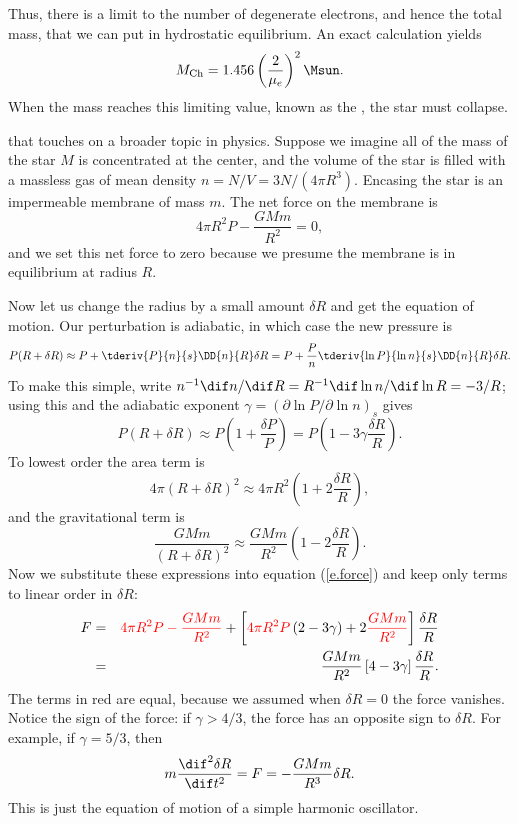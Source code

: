 Thus, there is a limit to the number of degenerate electrons, and hence the total mass, that we can put in hydrostatic equilibrium.  An exact calculation yields
\begin{equation}\label{e.Chandrasekhar}
	M_{\mathrm{Ch}} = 1.456 \left(\frac{2}{\mu_{e}}\right)^{2}\Msun.
\end{equation}
When the mass reaches this limiting value, known as the , the star must collapse.  

\cite{Cox1980Theory-of-Stell} that touches on a broader topic in physics.  Suppose we imagine all of the mass of the star $M$ is concentrated at the center, and the volume of the star is filled with a massless gas of mean density $n = N/V = 3N/(4\pi R^{3})$. Encasing the star is an impermeable membrane of mass $m$.  The net force on the membrane is
\begin{equation}\label{e.force}
	4\pi R^{2} P - \frac{GMm}{R^{2}} = 0,
\end{equation}
and we set this net force to zero because we presume the membrane is in equilibrium at radius $R$.

Now let us change the radius by a small amount $\delta R$ and get the equation of motion. Our perturbation is adiabatic, in which case the new pressure is
\[ 
	P(R+\delta R) \approx P + \tderiv{P}{n}{s}\DD{n}{R}\delta R 
	= P + \frac{P}{n}\tderiv{\ln P}{\ln n}{s} \DD{n}{R}\delta R. 
\]
To make this simple, write $n^{-1}\dif n/\dif R = R^{-1}\dif\ln n/\dif\ln R = -3/R$; using this and the adiabatic exponent $\gamma = (\partial\ln P/\partial\ln n)_{s}$ gives
\[
	P(R+\delta R) \approx P\left(1 + \frac{\delta P}{P}\right) 
	= P\left(1 - 3\gamma \frac{\delta R}{R}\right).
\]
To lowest order the area term is
\[ 4\pi (R+\delta R)^{2} \approx 4\pi R^{2}\left(1 + 2\frac{\delta R}{R}\right), \]
and the gravitational term is
\[
	\frac{GMm}{(R+\delta R)^{2}} \approx \frac{GMm}{R^{2}}\left(1-2\frac{\delta R}{R}\right).
\]
Now we substitute these expressions into equation (\ref{e.force}) and keep only terms to linear order in $\delta R$:
\begin{eqnarray}
	F &=& \color{red} 4\pi R^{2} P - \frac{GMm}{R^{2}}
	\color{black} + \left[{\color{red}4\pi R^{2}P}\left( 2 - 3\gamma \right) + 2 {\color{red}\frac{GMm}{R^{2}}} \right ] \frac{\delta R}{R} \nonumber\\
	&=& \frac{GMm}{R^{2}} \left[4 - 3\gamma\right]\frac{\delta R}{R}.
\end{eqnarray}
The terms in red are equal, because we assumed when $\delta R = 0$ the force vanishes.  Notice the sign of the force: if $\gamma > 4/3$, the force has an opposite sign to $\delta R$. For example, if $\gamma = 5/3$, then 
\begin{equation}\label{e.SHO}
	m\frac{\dif^{2}\delta R}{\dif t^{2}} = F  = - \frac{GMm}{R^{3}}\delta R.
\end{equation}
This is just the equation of motion of a simple harmonic oscillator.

